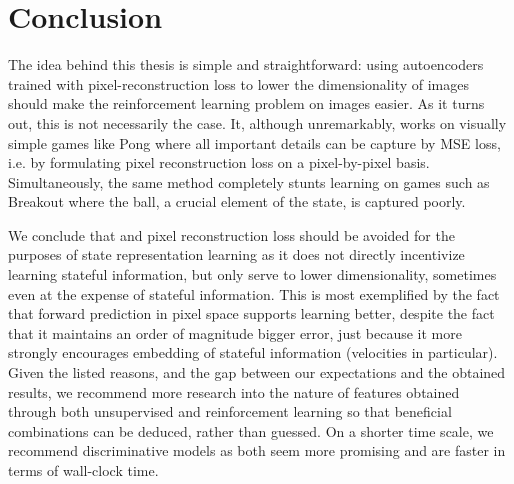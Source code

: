 \chapter{Conclusion}
The idea behind this thesis is simple and straightforward:
using autoencoders trained with pixel-reconstruction loss 
to lower the dimensionality of images 
should make the reinforcement learning problem on images easier.
As it turns out, this is not necessarily the case.
It, although unremarkably, works on visually simple games like Pong where
all important details can be capture by MSE loss, i.e. by formulating pixel reconstruction loss
on a pixel-by-pixel basis.
Simultaneously, the same method completely stunts learning on games such as Breakout
where the ball, a crucial element of the state, is captured poorly.

We conclude that and pixel reconstruction loss should be avoided for the purposes of state representation learning
as it does not directly incentivize learning stateful information, but only serve to lower dimensionality,
sometimes even at the expense of stateful information.
This is most exemplified by the fact that forward prediction in pixel space supports learning better,
despite the fact that it maintains an order of magnitude bigger error,
just because it more strongly encourages embedding of stateful information (velocities in particular).
Given the listed reasons, and the gap between our expectations and the obtained results, we recommend 
more research into the nature of features obtained through both unsupervised and reinforcement learning 
so that beneficial combinations can be deduced, rather than guessed.
On a shorter time scale, we recommend discriminative models as both seem more promising 
and are faster in terms of wall-clock time. 


%
%

